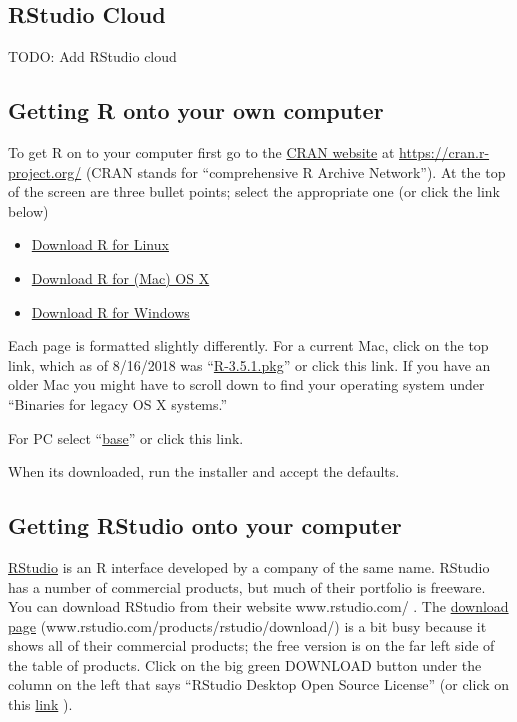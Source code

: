 \documentclass[
]{book}
\providecommand{\tightlist}{%
  \setlength{\itemsep}{0pt}\setlength{\parskip}{0pt}}
\begin{document}
\hypertarget{rstudio-cloud}{%
\subsection{RStudio Cloud}\label{rstudio-cloud}}

TODO: Add RStudio cloud

\hypertarget{getting-r-onto-your-own-computer}{%
\subsection{Getting R onto your own computer}\label{getting-r-onto-your-own-computer}}

To get R on to your computer first go to the \href{https://cran.r-project.org/}{CRAN website} at \url{https://cran.r-project.org/} (CRAN stands for ``comprehensive R Archive Network''). At the top of the screen are three bullet points; select the appropriate one (or click the link below)

\begin{itemize}
\tightlist
\item
  \href{https://cran.r-project.org/bin/linux/}{Download R for Linux}
\item
  \href{https://cran.r-project.org/bin/macosx/}{Download R for (Mac) OS X}
\item
  \href{https://cran.r-project.org/bin/windows/}{Download R for Windows}
\end{itemize}

Each page is formatted slightly differently. For a current Mac, click on the top link, which as of 8/16/2018 was ``\href{https://cran.r-project.org/bin/macosx/R-3.5.1.pkg}{R-3.5.1.pkg}'' or click this link. If you have an older Mac you might have to scroll down to find your operating system under ``Binaries for legacy OS X systems.''

For PC select ``\href{https://cran.r-project.org/bin/windows/base/}{base}'' or click this link.

When its downloaded, run the installer and accept the defaults.

\hypertarget{getting-rstudio-onto-your-computer}{%
\subsection{Getting RStudio onto your computer}\label{getting-rstudio-onto-your-computer}}

\href{www.rstudio.com/}{RStudio} is an R interface developed by a company of the same name. RStudio has a number of commercial products, but much of their portfolio is freeware. You can download RStudio from their website www.rstudio.com/ . The \href{https://www.rstudio.com/products/rstudio/download/}{download page} (www.rstudio.com/products/rstudio/download/) is a bit busy because it shows all of their commercial products; the free version is on the far left side of the table of products. Click on the big green DOWNLOAD button under the column on the left that says ``RStudio Desktop Open Source License'' (or click on this \href{https://www.rstudio.com/products/rstudio/download/\#download}{link} ).
\end{document}
